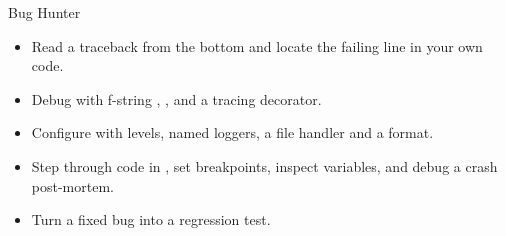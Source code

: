 \begin{achievement}{Bug Hunter}
\begin{itemize}[leftmargin=*,itemsep=1pt]
\item Read a traceback from the bottom and locate the failing line in your own code.
\item Debug with f-string \code{=}, ,  and a tracing decorator.
\item Configure  with levels, named loggers, a file handler and a format.
\item Step through code in , set breakpoints, inspect variables, and debug a crash post-mortem.
\item Turn a fixed bug into a regression test.
\end{itemize}
\end{achievement}

